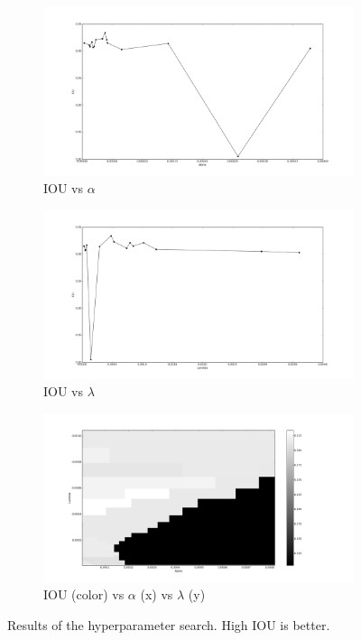 \begin{figure}[h]
	\centering
	\begin{subfigure}{0.32\textwidth}
		\centering
                \includegraphics[width=\textwidth]{plots/hs5_alpha.png}
         \caption{IOU vs $\alpha$}
	\end{subfigure}
	\begin{subfigure}{0.32\textwidth}
		\centering
                \includegraphics[width=\textwidth]{plots/hs5_lambda.png}
         \caption{IOU vs $\lambda$}
	\end{subfigure}
	\begin{subfigure}{0.32\textwidth}
		\centering
                \includegraphics[width=\textwidth]{plots/hs5_pcolor.png}
         \caption{IOU (color) vs $\alpha$ (x) vs $\lambda$ (y)}
	\end{subfigure}
	\caption[Hyperparameter search for Experiment 3]{Results of the hyperparameter search. High IOU is better.}
	 \label{fig:Hs5}
\end{figure}

